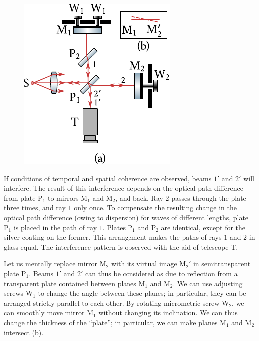 \begin{figure}[t]
	\begin{center}
		\includegraphics[scale=1]{figures/ch_17/fig_17_16.pdf}
		\caption[]{}
		\label{fig:17_16}
	\end{center}
	\vspace{-0.8cm}
\end{figure}

If conditions of temporal and spatial coherence are observed, beams $1'$ and $2'$ will interfere.
The result of this interference depends on the optical path difference from plate P$_1$ to mirrors M$_1$ and M$_2$, and back.
Ray $2$ passes through the plate three times, and ray $1$ only once.
To compensate the resulting change in the optical path difference (owing to dispersion) for waves of different lengths, plate P$_1$ is placed in the path of ray $1$.
Plates P$_1$ and P$_2$ are identical, except for the silver coating on the former.
This arrangement makes the paths of rays $1$ and $2$ in glass equal.
The interference pattern is observed with the aid of telescope T.

Let us mentally replace mirror M$_2$ with its virtual image M$_2'$ in semitransparent plate P$_1$.
Beams $1'$ and $2'$ can thus be considered as due to reflection from a transparent plate contained between planes M$_1$ and M$_2$.
We can use adjusting screws W$_1$ to change the angle between these planes; in particular, they can be arranged strictly parallel to each other.
By rotating micrometric screw W$_2$, we can smoothly move mirror M$_1$ without changing its inclination.
We can thus change the thickness of the ``plate''; in particular, we can make planes M$_1$ and M$_2$ intersect (b).

